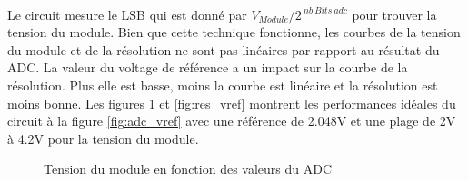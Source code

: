 	\paragraph*{}
	Le circuit mesure le LSB qui est donné par $V_{Module} / 2^{~nb~Bits~adc}$ pour  trouver la tension du module. Bien que cette technique fonctionne, les courbes de la tension du module et de la résolution ne sont pas linéaires par rapport au résultat du ADC. La valeur du voltage de référence a un impact sur la courbe de la résolution. Plus elle est basse, moins la courbe est linéaire et la résolution est moins bonne. Les figures \ref{fig:vmodule_vref} et \ref{fig:res_vref} montrent les performances idéales du circuit à la figure \ref{fig:adc_vref} avec une référence de 2.048V et une plage de 2V à 4.2V pour la tension du module.
	
	\begin{figure}[H]
		\begin{minipage}{0.45\textwidth}
			\centering
			\caption{Tension du module en fonction des valeurs du ADC}
			\label{fig:vmodule_vref}
		\end{minipage}
		\hfill
		\begin{minipage}{0.45\textwidth}
			\centering

\end{minipage}
\end{figure}
